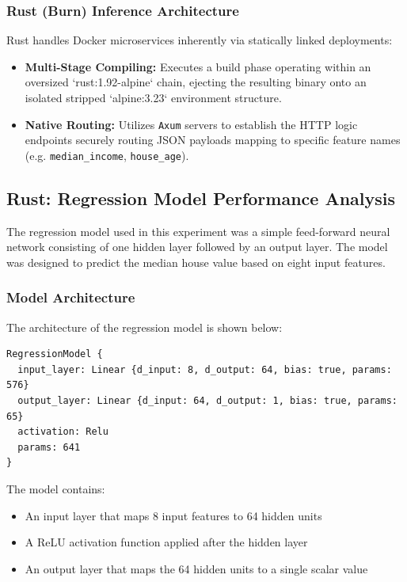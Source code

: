 \documentclass{ieeeaccess}
\begin{document}
\subsubsection{Rust (Burn) Inference Architecture}
Rust handles Docker microservices inherently via statically linked deployments:
\begin{itemize}
    \item \textbf{Multi-Stage Compiling:} Executes a build phase operating within an oversized `rust:1.92-alpine` chain, ejecting the resulting binary onto an isolated stripped `alpine:3.23` environment structure.
    \item \textbf{Native Routing:} Utilizes \texttt{Axum} servers to establish the HTTP logic endpoints securely routing JSON payloads mapping to specific feature names (e.g. \texttt{median\_income}, \texttt{house\_age}).
\end{itemize}

\subsection{Rust: Regression Model Performance Analysis}

The regression model used in this experiment was a simple feed-forward neural network consisting of one hidden layer followed by an output layer. The model was designed to predict the median house value based on eight input features.

\subsubsection{Model Architecture}

The architecture of the regression model is shown below:

\begin{lstlisting}
RegressionModel {
  input_layer: Linear {d_input: 8, d_output: 64, bias: true, params: 576}
  output_layer: Linear {d_input: 64, d_output: 1, bias: true, params: 65}
  activation: Relu
  params: 641
}
\end{lstlisting}

The model contains:

\begin{itemize}
    \item An input layer that maps 8 input features to 64 hidden units
    \item A ReLU activation function applied after the hidden layer
    \item An output layer that maps the 64 hidden units to a single scalar value
\end{itemize}
\end{document}

